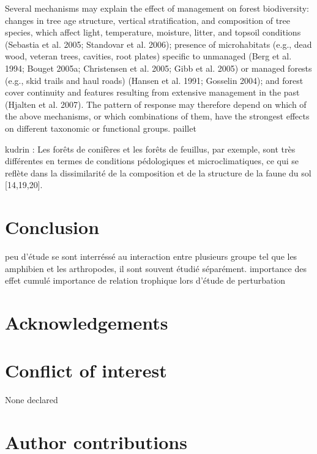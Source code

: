  Several mechanisms may explain the effect of management on forest biodiversity: changes in tree age structure, vertical stratification, and composition of tree species, which affect light, temperature, moisture, litter, and topsoil conditions (Sebastia et al. 2005; Standovar et al. 2006); presence of microhabitats (e.g., dead wood, veteran trees, cavities, root plates) specific to unmanaged (Berg et al. 1994; Bouget 2005a; Christensen et al. 2005; Gibb et al. 2005) or managed forests (e.g., skid trails and haul roads) (Hansen et al. 1991; Gosselin 2004); and forest cover continuity and features resulting from extensive management in the past (Hjalten et al. 2007). The pattern of response may therefore depend on which of the above mechanisms, or which combinations of them, have the strongest effects on different taxonomic or functional groups. paillet 

  kudrin :
Les forêts de conifères et les forêts de feuillus, par exemple, sont très différentes en termes de conditions pédologiques et microclimatiques, ce qui se reflète dans la dissimilarité de la composition et de la structure de la faune du sol [14,19,20].


\section*{Conclusion}
\label{sec:conclu1}

peu d'étude se sont interréssé au interaction entre plusieurs groupe tel que les amphibien et les arthropodes, il sont souvent étudié séparément.
importance des effet cumulé
importance de relation trophique lors d'étude de perturbation

\section*{Acknowledgements}
\label{sec:acknowl1}

\section*{Conflict of interest}
\label{sec:conflict1}

None declared
\section*{Author contributions}
\label{sec:author1}

\cleardoublepage

\begin{otherlanguage}{english}

\end{otherlanguage}
